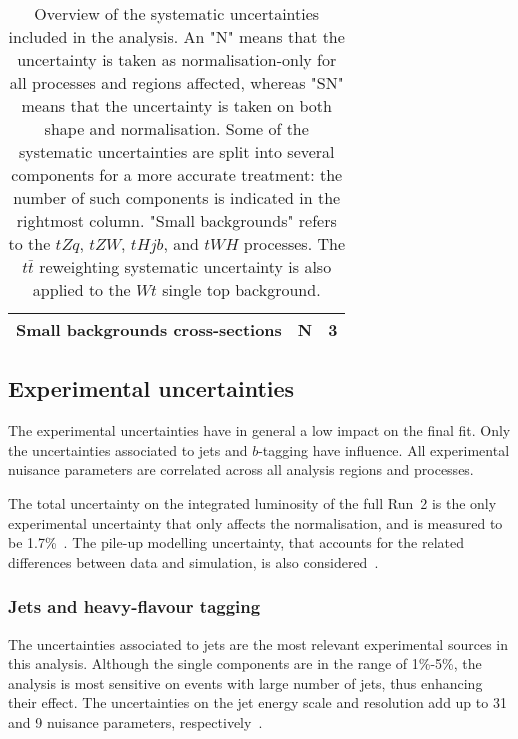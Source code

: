 \begin{table}[htbp]
\begin{tabular}{lcc}
  \hspace{2ex}Small backgrounds cross-sections	&   N  &  3  \\
  \bottomrule
  \bottomrule
  \end{tabular}
  \caption{
  Overview of the systematic uncertainties included in the analysis.
  An "N" means that the uncertainty is taken as normalisation-only for all processes and regions affected,  whereas "SN" means that the uncertainty is taken on both shape and normalisation. Some of the systematic uncertainties are split into several components for a more accurate treatment:  the number of such components is indicated in the rightmost column.
  "Small backgrounds" refers to the $tZq$, $tZW$, %
  $tHjb$, and $tWH$ processes. The $t\bar t$ reweighting systematic uncertainty is also applied to the $Wt$ single top background.
  }
  \label{Hplustb:tablesys}
\end{table}

\subsection{Experimental uncertainties}
The experimental uncertainties have in general a low impact on the final fit. Only the uncertainties associated to jets and $b$-tagging have influence. All experimental nuisance parameters are correlated across all analysis regions and processes.

The total uncertainty on the integrated luminosity of the full Run~2 is the only experimental uncertainty that only affects the normalisation, and is measured to be 1.7\%~\cite{luminosity}. The pile-up modelling uncertainty, that accounts for the related differences between data and simulation, is also considered~\cite{PhysRevLett.117.182002}.

\subsubsection{Jets and heavy-flavour tagging}
The uncertainties associated to jets are the most relevant experimental sources in this analysis. Although the single components are in the range of 1\%-5\%, the analysis is most sensitive on events with large number of jets, thus enhancing their effect. The uncertainties on the jet energy scale and resolution add up to 31 and 9 nuisance parameters, respectively~\cite{ATLAS_Collaboration2020-wc,Aaboud_2020}.


